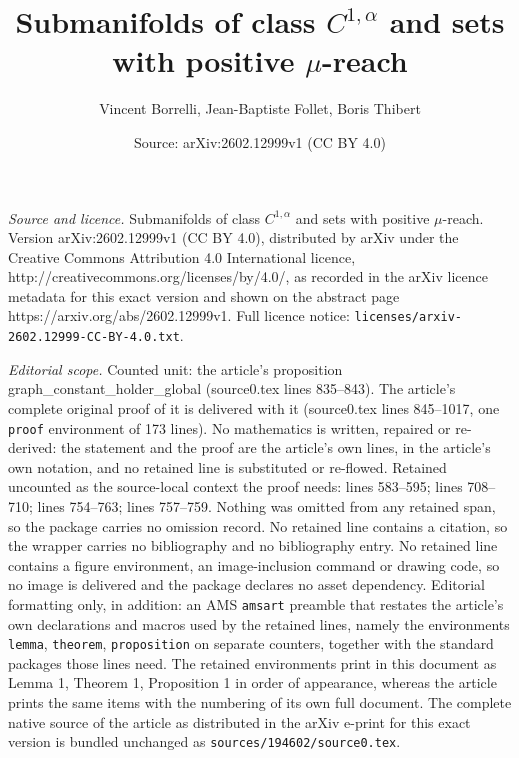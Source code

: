 \documentclass[10pt,a4paper]{amsart}
\title{Submanifolds of class $C^{1,\alpha}$ and sets with positive $\mu$-reach}
\author{Vincent Borrelli, Jean-Baptiste Follet, Boris Thibert}
\date{Source: arXiv:2602.12999v1 (CC BY 4.0)}
\begin{document}
\maketitle

\noindent\emph{Source and licence.} Submanifolds of class $C^{1,\alpha}$ and sets with positive $\mu$-reach. Version arXiv:2602.12999v1 (CC BY 4.0), distributed by arXiv under the Creative Commons Attribution 4.0 International licence, http://creativecommons.org/licenses/by/4.0/, as recorded in the arXiv licence metadata for this exact version and shown on the abstract page https://arxiv.org/abs/2602.12999v1. Full licence notice: \texttt{licenses/arxiv-2602.12999-CC-BY-4.0.txt}.\par\smallskip

\noindent\textit{Editorial scope.} Counted unit: the article's proposition graph\_constant\_holder\_global (source0.tex lines 835--843). The article's complete original proof of it is delivered with it (source0.tex lines 845--1017, one \texttt{proof} environment of 173 lines). No mathematics is written, repaired or re-derived: the statement and the proof are the article's own lines, in the article's own notation, and no retained line is substituted or re-flowed.  Retained uncounted as the source-local context the proof needs: lines 583--595; lines 708--710; lines 754--763; lines 757--759.  Nothing was omitted from any retained span, so the package carries no omission record.  No retained line contains a citation, so the wrapper carries no bibliography and no bibliography entry.  No retained line contains a figure environment, an image-inclusion command or drawing code, so no image is delivered and the package declares no asset dependency.  Editorial formatting only, in addition: an AMS \texttt{amsart} preamble that restates the article's own declarations and macros used by the retained lines, namely the environments \texttt{lemma}, \texttt{theorem}, \texttt{proposition} on separate counters, together with the standard packages those lines need.  The retained environments print in this document as Lemma 1, Theorem 1, Proposition 1 in order of appearance, whereas the article prints the same items with the numbering of its own full document.  The complete native source of the article as distributed in the arXiv e-print for this exact version is bundled unchanged as \texttt{sources/194602/source0.tex}.
\end{document}
